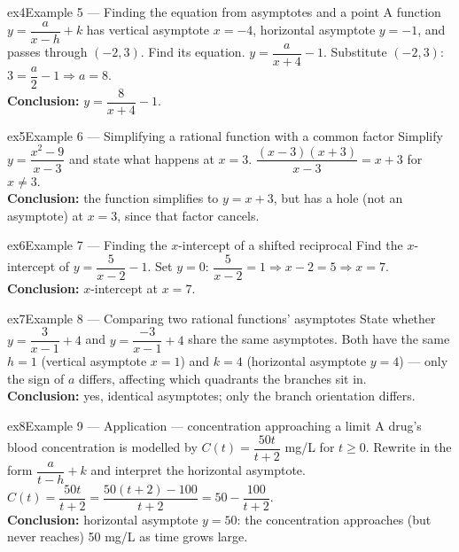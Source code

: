 \documentclass[11pt]{article}
\begin{document}
\begin{example}{ex4}{Example 5 --- Finding the equation from asymptotes and a point}
A function $y=\dfrac{a}{x-h}+k$ has vertical asymptote $x=-4$, horizontal asymptote $y=-1$, and passes through $(-2,3)$. Find its equation.\soln
$y=\dfrac{a}{x+4}-1$. Substitute $(-2,3)$: $3=\dfrac a2-1\Rightarrow a=8$.\\[3pt]\textbf{Conclusion:} $y=\dfrac{8}{x+4}-1$.
\end{example}

\begin{example}{ex5}{Example 6 --- Simplifying a rational function with a common factor}
Simplify $y=\dfrac{x^2-9}{x-3}$ and state what happens at $x=3$.\soln
$\dfrac{(x-3)(x+3)}{x-3}=x+3$ for $x\neq3$.\\[3pt]\textbf{Conclusion:} the function simplifies to $y=x+3$, but has a hole (not an asymptote) at $x=3$, since that factor cancels.
\end{example}

\begin{example}{ex6}{Example 7 --- Finding the $x$-intercept of a shifted reciprocal}
Find the $x$-intercept of $y=\dfrac{5}{x-2}-1$.\soln
Set $y=0$: $\dfrac{5}{x-2}=1\Rightarrow x-2=5\Rightarrow x=7$.\\[3pt]\textbf{Conclusion:} $x$-intercept at $x=7$.
\end{example}

\begin{example}{ex7}{Example 8 --- Comparing two rational functions' asymptotes}
State whether $y=\dfrac{3}{x-1}+4$ and $y=\dfrac{-3}{x-1}+4$ share the same asymptotes.\soln
Both have the same $h=1$ (vertical asymptote $x=1$) and $k=4$ (horizontal asymptote $y=4$) --- only the sign of $a$ differs, affecting which quadrants the branches sit in.\\[3pt]\textbf{Conclusion:} yes, identical asymptotes; only the branch orientation differs.
\end{example}

\begin{example}{ex8}{Example 9 --- Application --- concentration approaching a limit}
A drug's blood concentration is modelled by $C(t)=\dfrac{50t}{t+2}$ mg/L for $t\geq0$. Rewrite in the form $\dfrac a{t-h}+k$ and interpret the horizontal asymptote.\soln
$C(t)=\dfrac{50t}{t+2}=\dfrac{50(t+2)-100}{t+2}=50-\dfrac{100}{t+2}$.\\[3pt]\textbf{Conclusion:} horizontal asymptote $y=50$: the concentration approaches (but never reaches) 50 mg/L as time grows large.
\end{example}
\end{document}
